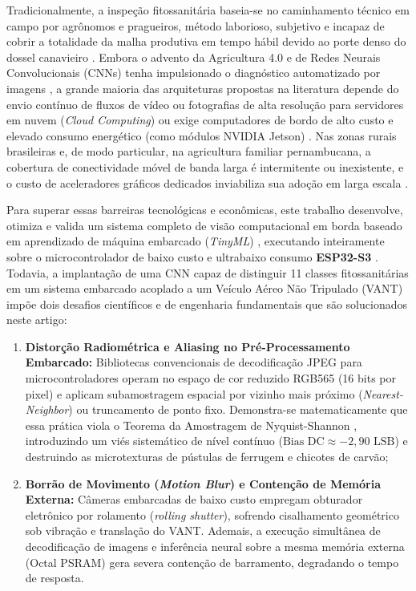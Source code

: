 \documentclass[12pt]{article}
\begin{document}
Tradicionalmente, a inspeção fitossanitária baseia-se no caminhamento técnico em campo por agrônomos e pragueiros, método laborioso, subjetivo e incapaz de cobrir a totalidade da malha produtiva em tempo hábil devido ao porte denso do dossel canavieiro \parencite{radoglou2020compilation}. Embora o advento da Agricultura 4.0 e de Redes Neurais Convolucionais (CNNs) tenha impulsionado o diagnóstico automatizado por imagens \parencite{lu2022,xu2023}, a grande maioria das arquiteturas propostas na literatura depende do envio contínuo de fluxos de vídeo ou fotografias de alta resolução para servidores em nuvem (\textit{Cloud Computing}) ou exige computadores de bordo de alto custo e elevado consumo energético (como módulos NVIDIA Jetson) \parencite{rodriguez2021sugarcane}. Nas zonas rurais brasileiras e, de modo particular, na agricultura familiar pernambucana, a cobertura de conectividade móvel de banda larga é intermitente ou inexistente, e o custo de aceleradores gráficos dedicados inviabiliza sua adoção em larga escala \parencite{oliveira2024,he2023}.

Para superar essas barreiras tecnológicas e econômicas, este trabalho desenvolve, otimiza e valida um sistema completo de visão computacional em borda baseado em aprendizado de máquina embarcado (\textit{TinyML}) \parencite{warden2019}, executando inteiramente sobre o microcontrolador de baixo custo e ultrabaixo consumo \textbf{ESP32-S3} \parencite{esp32s3,espressif2023esp32s3}. Todavia, a implantação de uma CNN capaz de distinguir 11 classes fitossanitárias em um sistema embarcado acoplado a um Veículo Aéreo Não Tripulado (VANT) impõe dois desafios científicos e de engenharia fundamentais que são solucionados neste artigo:
\begin{enumerate}
    \item \textbf{Distorção Radiométrica e Aliasing no Pré-Processamento Embarcado:} Bibliotecas convencionais de decodificação JPEG para microcontroladores operam no espaço de cor reduzido RGB565 (16 bits por pixel) e aplicam subamostragem espacial por vizinho mais próximo (\textit{Nearest-Neighbor}) ou truncamento de ponto fixo. Demonstra-se matematicamente que essa prática viola o Teorema da Amostragem de Nyquist-Shannon \parencite{nyquist1928certain,shannon1949communication}, introduzindo um viés sistemático de nível contínuo ($\text{Bias DC} \approx -2,90\text{ LSB}$) e destruindo as microtexturas de pústulas de ferrugem e chicotes de carvão;
    \item \textbf{Borrão de Movimento (\textit{Motion Blur}) e Contenção de Memória Externa:} Câmeras embarcadas de baixo custo empregam obturador eletrônico por rolamento (\textit{rolling shutter}), sofrendo cisalhamento geométrico sob vibração e translação do VANT. Ademais, a execução simultânea de decodificação de imagens e inferência neural sobre a mesma memória externa (Octal PSRAM) gera severa contenção de barramento, degradando o tempo de resposta.
\end{enumerate}
\end{document}
